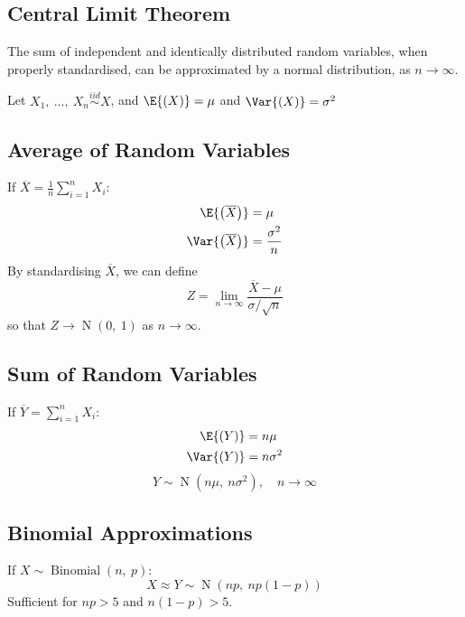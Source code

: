 \documentclass{article}
\begin{document}
\begin{minipage}{126.1962963mm}
    \begin{multicols}{2}
        \section{Central Limit Theorem}
        The sum of independent and identically distributed random variables, when properly standardised,
        can be approximated by a normal distribution, as \(n \to \infty\).

        Let \(X_1,\: \ldots,\: X_n \overset{iid}{\sim} X\), and
        \(\E{\left( X \right)} = \mu\) and \(\Var{\left( X \right)} = \sigma^2\)
        \subsection{Average of Random Variables}
        If \(\overline{X} = \frac{1}{n} \sum_{i = 1}^n X_i\):
        \begin{align*}
            \E{\left( \overline{X} \right)}   & = \mu                \\
            \Var{\left( \overline{X} \right)} & = \frac{\sigma^2}{n}
        \end{align*}
        By standardising \(\overline{X}\), we can define
        \begin{equation*}
            Z = \lim_{n \to \infty} \frac{\overline{X} - \mu}{\sigma / \sqrt{n}}
        \end{equation*}
        so that \(Z \to \operatorname{N}{\left( 0,\: 1 \right)}\) as \(n \to \infty\).
        \subsection{Sum of Random Variables}
        If \(\overline{Y} = \sum_{i = 1}^n X_i\):
        \begin{align*}
            \E{\left( Y \right)}   & = n \mu      \\
            \Var{\left( Y \right)} & = n \sigma^2
        \end{align*}
        \begin{equation*}
            Y \sim \operatorname{N}{\left( n \mu,\: n \sigma^2 \right)}, \quad n \to \infty
        \end{equation*}
        \subsection{Binomial Approximations}
        If \(X \sim \operatorname{Binomial}{\left( n,\: p \right)}\):
        \begin{equation*}
            X \approx Y \sim \operatorname{N}{\left( np,\: np\left( 1 - p \right) \right)}
        \end{equation*}
        Sufficient for \(np > 5\) and \(n\left( 1 - p \right) > 5\).


\end{multicols}
\end{minipage}
\end{document}

